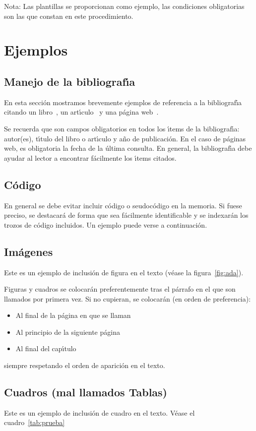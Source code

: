 Nota: Las plantillas se proporcionan como ejemplo, las condiciones obligatorias son las que constan en este procedimiento.

\chapter{Ejemplos}\label{cap2} 
					
\section{Manejo de la bibliograf{\'\i}a}
En esta secci\'on mostramos brevemente ejemplos de referencia a la bibliograf{\'\i}a 
citando un libro~\cite{desousa}, un art{\'\i}culo~\cite{guiatitlesec} 
y una p\'agina web~\cite{informatica}. 

Se recuerda que son campos obligatorios
en todos los {\'\i}tems de la bibliograf{\'\i}a: 
autor(es), t{\'\i}tulo del libro o art{\'\i}culo 
y a{\~n}o de publicaci\'on.
En el caso de p\'aginas web, 
es obligatoria la fecha de la \'ultima consulta. 
En general, la bibliograf{\'\i}a debe ayudar al lector a encontrar f\'acilmente los {\'\i}tems citados.

\section{C\'odigo}

En general se debe evitar incluir c\'odigo o seudoc\'odigo en la memoria. Si fuese preciso, se destacar\'a de forma
que sea f\'acilmente identificable y se indexar\'an los trozos de c\'odigo incluidos. Un ejemplo puede verse
a continuaci\'on.


\section{Im\'agenes}

Este es un ejemplo de inclusi\'on de figura en el texto (v\'ease la figura~\ref{fig:ada}). 


Figuras y cuadros se colocar\'an preferentemente tras el p\'arrafo en el que
son llamados por primera vez. Si no cupieran, se colocar\'an (en orden de preferencia):
\begin{itemize}
 \item Al final de la p\'agina en que se llaman
 \item Al principio de la siguiente p\'agina
 \item Al final del cap{\'\i}tulo
\end{itemize}
siempre respetando el orden de aparici\'on en el texto.

\section{Cuadros (mal llamados Tablas)}

Este es un ejemplo de inclusi\'on de cuadro en el texto. V\'ease el cuadro~\ref{tab:prueba}

